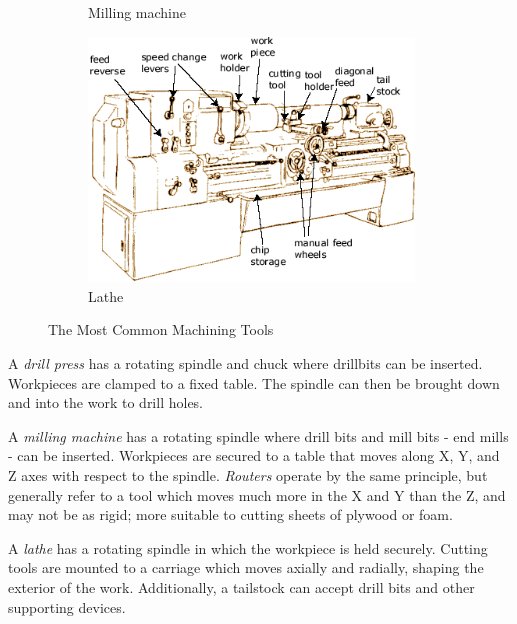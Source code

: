 \documentclass[10pt,letterpaper]{book}
\begin{document}
\begin{figure}[H]
\begin{subfigure}[b]{.34\linewidth}
		\caption{Milling machine}
	\end{subfigure}	\begin{subfigure}[b]{.4\linewidth}
		\includegraphics[width=0.95\textwidth]{imgs/lathe.png}
		\caption{Lathe}
	\end{subfigure}	
	
	\caption{The Most Common Machining Tools}
\end{figure}

 \begin{asparaenum}[a)]
 	\item A \textit{drill press} has a rotating spindle and chuck where drillbits can be inserted. Workpieces are clamped to a fixed table. The spindle can then be brought down and into the work to drill holes.
 	\item A \textit{milling machine} has a rotating spindle where drill bits and mill bits - end mills - can be inserted. Workpieces are secured to a table that moves along X, Y, and Z axes with respect to the spindle. \textit{Routers} operate by the same principle, but generally refer to a tool which moves much more in the X and Y than the Z, and may not be as rigid; more suitable to cutting sheets of plywood or foam.
 	\item A \textit{lathe} has a rotating spindle in which the workpiece is held securely. Cutting tools are mounted to a carriage which moves axially and radially, shaping the exterior of the work. Additionally, a tailstock can accept drill bits and other supporting devices.
 \end{asparaenum}
 
\end{document}
